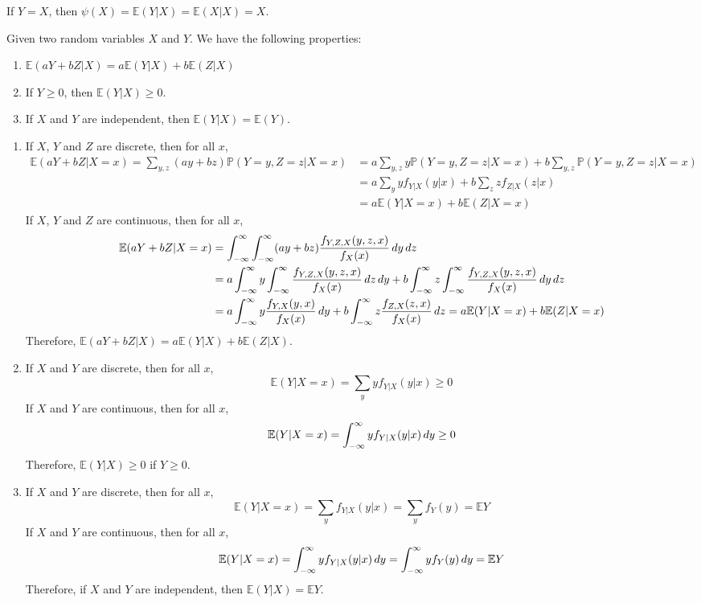 \documentclass{huhtakm-template-book}
\newcommand{\prob}{\mathbb{P}}
\newcommand{\expect}{\mathbb{E}}
\begin{document}
\begin{eg}
	If $Y=X$, then $\psi(X)=\expect(Y|X)=\expect(X|X)=X$.
\end{eg}
\begin{lem}
	Given two random variables $X$ and $Y$. We have the following properties:
	\begin{enumerate}
		\item $\expect(aY+bZ|X)=a\expect(Y|X)+b\expect(Z|X)$
		\item If $Y\geq 0$, then $\expect(Y|X)\geq 0$.
		\item If $X$ and $Y$ are independent, then $\expect(Y|X)=\expect(Y)$.
	\end{enumerate}
\end{lem}
\begin{proofing}
	\begin{enumerate}
		\item If $X$, $Y$ and $Z$ are discrete, then for all $x$,
		\begin{align*}
			\expect(aY+bZ|X=x)=\sum_{y,z}(ay+bz)\prob(Y=y,Z=z|X=x)&=a\sum_{y,z}y\prob(Y=y,Z=z|X=x)+b\sum_{y,z}\prob(Y=y,Z=z|X=x)\\
			&=a\sum_{y}yf_{Y|X}(y|x)+b\sum_{z}zf_{Z|X}(z|x)\\
			&=a\expect(Y|X=x)+b\expect(Z|X=x)
		\end{align*}
		If $X$, $Y$ and $Z$ are continuous, then for all $x$,
		\begin{align*}
			\expect(aY+bZ|X=x)&=\intinfty\intinfty(ay+bz)\frac{f_{Y,Z,X}(y,z,x)}{f_{X}(x)}\,dy\,dz\\
			&=a\intinfty y\intinfty\frac{f_{Y,Z,X}(y,z,x)}{f_{X}(x)}\,dz\,dy+b\intinfty z\intinfty\frac{f_{Y,Z,X}(y,z,x)}{f_{X}(x)}\,dy\,dz\\
			&=a\intinfty y\frac{f_{Y,X}(y,x)}{f_{X}(x)}\,dy+b\intinfty z\frac{f_{Z,X}(z,x)}{f_{X}(x)}\,dz=a\expect(Y|X=x)+b\expect(Z|X=x)
		\end{align*}
		Therefore, $\expect(aY+bZ|X)=a\expect(Y|X)+b\expect(Z|X)$.
		\item If $X$ and $Y$ are discrete, then for all $x$,
		\begin{equation*}
			\expect(Y|X=x)=\sum_{y}yf_{Y|X}(y|x)\geq 0
		\end{equation*}
		If $X$ and $Y$ are continuous, then for all $x$,
		\begin{equation*}
			\expect(Y|X=x)=\intinfty yf_{Y|X}(y|x)\,dy\geq 0
		\end{equation*}
		Therefore, $\expect(Y|X)\geq 0$ if $Y\geq 0$.
		\item If $X$ and $Y$ are discrete, then for all $x$,
		\begin{equation*}
			\expect(Y|X=x)=\sum_{y}f_{Y|X}(y|x)=\sum_{y}f_{Y}(y)=\expect{Y}
		\end{equation*}
		If $X$ and $Y$ are continuous, then for all $x$,
		\begin{equation*}
			\expect(Y|X=x)=\intinfty yf_{Y|X}(y|x)\,dy=\intinfty yf_{Y}(y)\,dy=\expect{Y}
		\end{equation*}
		Therefore, if $X$ and $Y$ are independent, then $\expect(Y|X)=\expect{Y}$.
	\end{enumerate}
\end{proofing}
\end{document}
